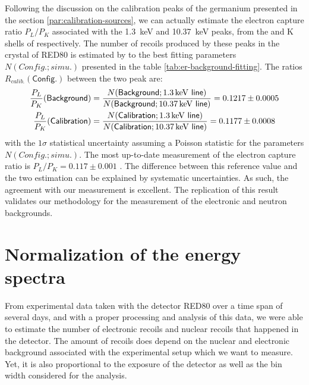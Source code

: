 
Following the discussion on the calibration peaks of the germanium presented in the section \ref{par:calibration-sources}, we can actually estimate the electron capture ratio $P_L/P_K$ associated with the \SI{1.3}{\kilo\eV} and \SI{10.37}{\kilo\eV} peaks, from the  and K shells of  respectively.
The number of recoils produced by these peaks in the crystal of RED80 is estimated by to the best fitting parameters $N(Config.; simu.)$ presented in the table \ref{tab:er-background-fitting}. The ratios $R_{calib.}(\textsf{Config.})$ between the two peak are:
\begin{align}
\frac{P_L}{P_K}(\textsf{Background}) 
&=
\frac{
N(\textsf{Background}; \textsf{\SI{1.3}{\kilo\eV} line})
}{
N(\textsf{Background}; \textsf{\SI{10.37}{\kilo\eV} line})
}
= 0.1217 \pm 0.0005
\\
\frac{P_L}{P_K} (\textsf{Calibration}) 
&=
\frac{
N(\textsf{Calibration}; \textsf{\SI{1.3}{\kilo\eV} line})
}{
N(\textsf{Calibration}; \textsf{\SI{10.37}{\kilo\eV} line})
}
= 0.1177 \pm 0.0008
\end{align}
with the $1\sigma$ statistical uncertainty assuming a Poisson statistic for the parameters $N(Config.; simu.)$. The most up-to-date measurement of the electron capture ratio is $P_L/P_K=0.117 \pm 0.001$ \cite{Bambynek:1977}. The difference between this reference value and the two estimation can be explained by systematic uncertainties. As such, the agreement with our measurement is excellent. The replication of this result validates our methodology for the measurement of the electronic and neutron backgrounds.


\section{Normalization of the energy spectra}
\label{par:exposure}
\label{par:normalization}

From experimental data taken with the detector RED80 over a time span of several days, and with a proper processing and analysis of this data, we were able to estimate the number of electronic recoils and nuclear recoils that happened in the detector.
The amount of recoils does depend on the nuclear and electronic background associated with the experimental setup which we want to measure. Yet, it is also proportional to the exposure of the detector as well as the bin width considered for the analysis.

